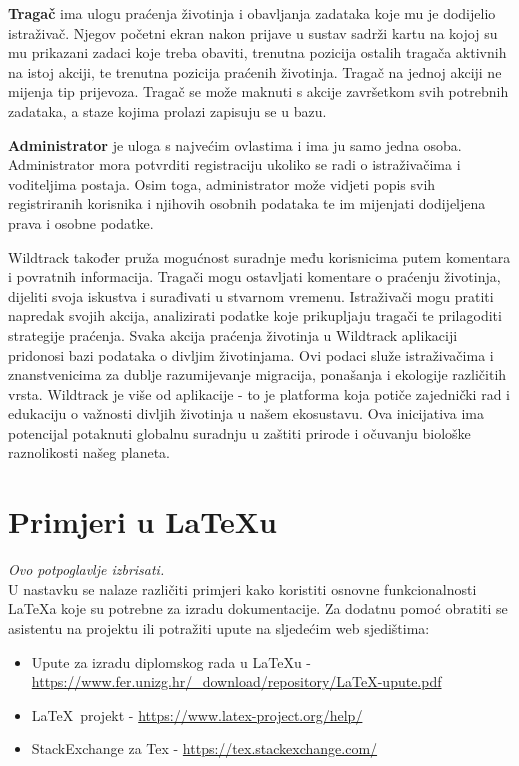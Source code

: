 		\textbf{Tragač} ima ulogu praćenja životinja i obavljanja zadataka koje mu je dodijelio istraživač. Njegov početni ekran nakon prijave u sustav sadrži kartu na kojoj su mu prikazani zadaci koje treba obaviti, trenutna pozicija ostalih tragača aktivnih na istoj akciji, te trenutna pozicija praćenih životinja. Tragač na jednoj akciji ne mijenja tip prijevoza. Tragač se može maknuti s akcije završetkom svih potrebnih zadataka, a staze kojima prolazi zapisuju se u bazu. \newline
		
		\textbf{Administrator} je uloga s najvećim ovlastima i ima ju samo jedna osoba. Administrator mora potvrditi registraciju ukoliko se radi o istraživačima i voditeljima postaja. Osim toga, administrator može vidjeti popis svih registriranih korisnika i njihovih osobnih podataka te im mijenjati dodijeljena prava i osobne podatke. \newline
		
		Wildtrack također pruža mogućnost suradnje među korisnicima putem komentara i povratnih informacija. Tragači mogu ostavljati komentare o praćenju životinja, dijeliti svoja iskustva i surađivati u stvarnom vremenu. Istraživači mogu pratiti napredak svojih akcija, analizirati podatke koje prikupljaju tragači te prilagoditi strategije praćenja. Svaka akcija praćenja životinja u Wildtrack aplikaciji pridonosi bazi podataka o divljim životinjama. Ovi podaci služe istraživačima i znanstvenicima za dublje razumijevanje migracija, ponašanja i ekologije različitih vrsta. Wildtrack je više od aplikacije - to je platforma koja potiče zajednički rad i edukaciju o važnosti divljih životinja u našem ekosustavu. Ova inicijativa ima potencijal potaknuti globalnu suradnju u zaštiti prirode i očuvanju biološke raznolikosti našeg planeta. \newline
		
		
		\section{Primjeri u \LaTeX u}
		
		\textit{Ovo potpoglavlje izbrisati.}\\

		U nastavku se nalaze različiti primjeri kako koristiti osnovne funkcionalnosti \LaTeX a koje su potrebne za izradu dokumentacije. Za dodatnu pomoć obratiti se asistentu na projektu ili potražiti upute na sljedećim web sjedištima:
		\begin{itemize}
			\item Upute za izradu diplomskog rada u \LaTeX u - \url{https://www.fer.unizg.hr/_download/repository/LaTeX-upute.pdf}
			\item \LaTeX\ projekt - \url{https://www.latex-project.org/help/}
			\item StackExchange za Tex - \url{https://tex.stackexchange.com/}\\
		
		\end{itemize} 	


